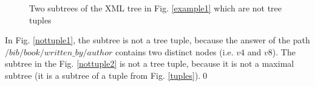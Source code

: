 \begin{example}
\begin{figure}[H]
    \centering
	\caption{Two subtrees of the XML tree in Fig. \ref{example1} which are not tree tuples}
    \label{nottuples}
\end{figure}

In Fig. \ref{nottuple1}, the subtree is not a tree tuple, because the answer of the path $/bib/book/written\_by/author$ contains two distinct nodes (i.e. $v4$ and $v8$). The subtree in the Fig. \ref{nottuple2} is not a tree tuple, because it is not a maximal subtree (it is a subtree of a tuple from Fig. \ref{tuples}).\qed

\end{example}

